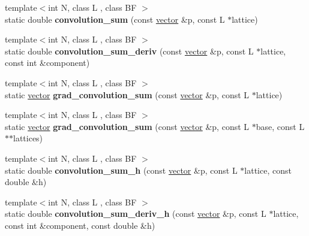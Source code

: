 \begin{DoxyCompactItemize}
{\footnotesize template$<$int N, class L , class BF $>$ }\\static double {\bfseries convolution\+\_\+sum} (const \hyperlink{namespacesisl_a2069bd5374a9be042ff3ce3306d41e1a}{vector} \&p, const L $\ast$lattice)
\item 
\mbox{\label{classsisl_1_1tp__linear_adee0c9f2ee87504cc2ef376b2e2c359a}} 
{\footnotesize template$<$int N, class L , class BF $>$ }\\static double {\bfseries convolution\+\_\+sum\+\_\+deriv} (const \hyperlink{namespacesisl_a2069bd5374a9be042ff3ce3306d41e1a}{vector} \&p, const L $\ast$lattice, const int \&component)
\item 
\mbox{\label{classsisl_1_1tp__linear_a98a633bfd39ce17e449820bfbff12cac}} 
{\footnotesize template$<$int N, class L , class BF $>$ }\\static \hyperlink{namespacesisl_a2069bd5374a9be042ff3ce3306d41e1a}{vector} {\bfseries grad\+\_\+convolution\+\_\+sum} (const \hyperlink{namespacesisl_a2069bd5374a9be042ff3ce3306d41e1a}{vector} \&p, const L $\ast$lattice)
\item 
\mbox{\label{classsisl_1_1tp__linear_a101bc6459e8046815c7f5ec093e983f8}} 
{\footnotesize template$<$int N, class L , class BF $>$ }\\static \hyperlink{namespacesisl_a2069bd5374a9be042ff3ce3306d41e1a}{vector} {\bfseries grad\+\_\+convolution\+\_\+sum} (const \hyperlink{namespacesisl_a2069bd5374a9be042ff3ce3306d41e1a}{vector} \&p, const L $\ast$base, const L $\ast$$\ast$lattices)
\item 
\mbox{\label{classsisl_1_1tp__linear_a01ac307fbb6d596d0397a10759540076}} 
{\footnotesize template$<$int N, class L , class BF $>$ }\\static double {\bfseries convolution\+\_\+sum\+\_\+h} (const \hyperlink{namespacesisl_a2069bd5374a9be042ff3ce3306d41e1a}{vector} \&p, const L $\ast$lattice, const double \&h)
\item 
\mbox{\label{classsisl_1_1tp__linear_a18c6496aaa2e3fbfe523f0251cd73da9}} 
{\footnotesize template$<$int N, class L , class BF $>$ }\\static double {\bfseries convolution\+\_\+sum\+\_\+deriv\+\_\+h} (const \hyperlink{namespacesisl_a2069bd5374a9be042ff3ce3306d41e1a}{vector} \&p, const L $\ast$lattice, const int \&component, const double \&h)
$$
\end{DoxyCompactItemize}
